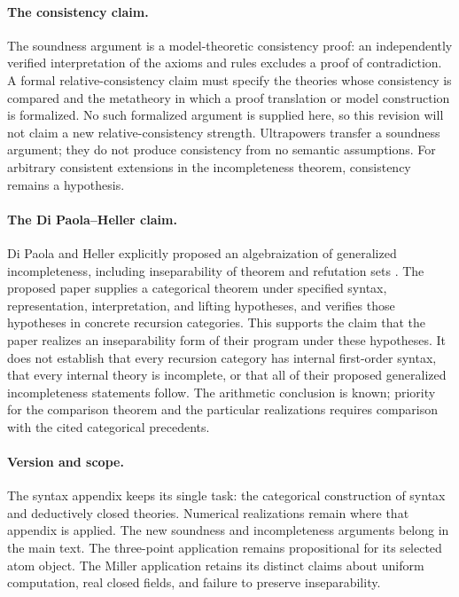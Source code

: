 \documentclass[11pt]{article}
\theoremstyle{definition}\newtheorem{definition}[theorem]{Definition}
\begin{document}
\paragraph{The consistency claim.}
The soundness argument is a model-theoretic consistency proof: an
independently verified interpretation of the axioms and rules excludes
a proof of contradiction. A formal relative-consistency claim must
specify the theories whose consistency is compared and the metatheory
in which a proof translation or model construction is formalized.
No such formalized argument is supplied here, so this revision will
not claim a new relative-consistency
strength. Ultrapowers transfer a soundness argument; they do not produce
consistency from no semantic assumptions. For arbitrary consistent
extensions in the incompleteness theorem, consistency remains a hypothesis.

\paragraph{The Di Paola--Heller claim.}
Di Paola and Heller explicitly proposed an algebraization of generalized
incompleteness, including inseparability of theorem and refutation sets
\cite{DPH}. The proposed paper supplies a categorical theorem under
specified syntax, representation, interpretation, and lifting hypotheses,
and verifies those hypotheses in concrete recursion categories.
This supports the claim that the paper realizes an inseparability form
of their program under these hypotheses. It does not establish that
every recursion category has internal first-order syntax, that every
internal theory is incomplete, or that all of their proposed generalized
incompleteness statements follow. The arithmetic conclusion is known;
priority for the comparison theorem and the particular realizations
requires comparison with the cited categorical precedents.

\paragraph{Version and scope.}
The syntax appendix keeps its single task: the categorical construction
of syntax and deductively closed theories. Numerical realizations remain
where that appendix is applied. The new soundness and incompleteness
arguments belong in the main text. The three-point application remains
propositional for its selected atom object. The Miller application retains
its distinct claims about uniform computation, real closed fields, and
failure to preserve inseparability.
\end{document}
